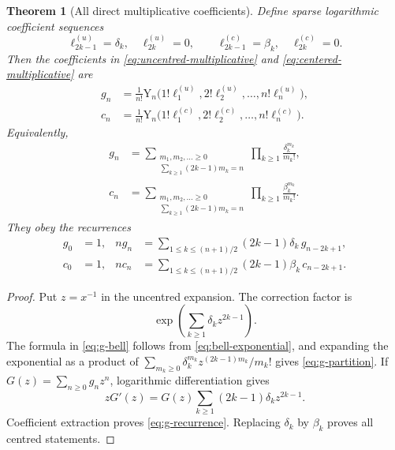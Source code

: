 \documentclass[11pt,a4paper,oneside]{article}
\theoremstyle{plain}
\newtheorem{theorem}{Theorem}[section]
\theoremstyle{definition}
\theoremstyle{remark}
\newcommand{\BellC}[1]{\mathrm Y_{#1}}
\begin{document}
\begin{theorem}[All direct multiplicative coefficients]
\label{thm:direct-coefficients}
Define sparse logarithmic coefficient sequences
\begin{equation}
 \ell^{(u)}_{2k-1}=\delta_k,\quad \ell^{(u)}_{2k}=0,
 \qquad
 \ell^{(c)}_{2k-1}=\beta_k,\quad \ell^{(c)}_{2k}=0.
 \label{eq:sparse-log-coeff}
\end{equation}
Then the coefficients in \cref{eq:uncentred-multiplicative} and
\cref{eq:centered-multiplicative} are
\begin{align}
 g_n&=\frac1{n!}\BellC{n}
 \bigl(1!\ell^{(u)}_1,2!\ell^{(u)}_2,\ldots,n!\ell^{(u)}_n\bigr),
 \label{eq:g-bell}\\
 c_n&=\frac1{n!}\BellC{n}
 \bigl(1!\ell^{(c)}_1,2!\ell^{(c)}_2,\ldots,n!\ell^{(c)}_n\bigr).
 \label{eq:c-bell}
\end{align}
Equivalently,
\begin{align}
 g_n&=\sum_{\substack{m_1,m_2,\ldots\ge0\\
             \sum_{k\ge1}(2k-1)m_k=n}}
       \prod_{k\ge1}\frac{\delta_k^{m_k}}{m_k!},
 \label{eq:g-partition}\\
 c_n&=\sum_{\substack{m_1,m_2,\ldots\ge0\\
             \sum_{k\ge1}(2k-1)m_k=n}}
       \prod_{k\ge1}\frac{\beta_k^{m_k}}{m_k!}.
 \label{eq:c-partition}
\end{align}
They obey the recurrences
\begin{align}
 g_0&=1,&
 n g_n&=\sum_{1\le k\le(n+1)/2}(2k-1)\delta_k\,g_{n-2k+1},
 \label{eq:g-recurrence}\\
 c_0&=1,&
 n c_n&=\sum_{1\le k\le(n+1)/2}(2k-1)\beta_k\,c_{n-2k+1}.
 \label{eq:c-recurrence}
\end{align}
\end{theorem}

\begin{proof}
Put $z=x^{-1}$ in the uncentred expansion.  The correction factor is
\[
 \exp\!\left(\sum_{k\ge1}\delta_kz^{2k-1}\right).
\]
The formula in \cref{eq:g-bell} follows from \cref{eq:bell-exponential}, and expanding
the exponential as a product of
$\sum_{m_k\ge0}\delta_k^{m_k}z^{(2k-1)m_k}/m_k!$ gives
\cref{eq:g-partition}.  If $G(z)=\sum_{n\ge0}g_nz^n$, logarithmic
differentiation gives
\[
 zG'(z)=G(z)\sum_{k\ge1}(2k-1)\delta_kz^{2k-1}.
\]
Coefficient extraction proves \cref{eq:g-recurrence}.  Replacing $\delta_k$
by $\beta_k$ proves all centred statements.
\end{proof}
\end{document}
